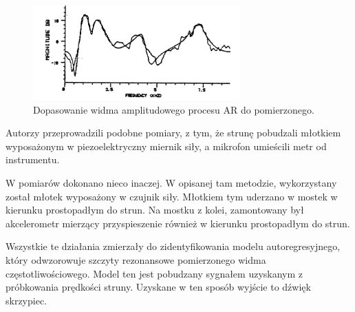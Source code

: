 \begin{figure}[H]
	\centering
	\includegraphics[width=8cm]{grafiki/hankel}
	\captionsetup{justification=centering}
	\caption{Dopasowanie widma amplitudowego procesu AR do pomierzonego.}
	\label{rys:hankel}
\end{figure}

Autorzy \cite{bowed_4} przeprowadzili podobne pomiary, z tym, że strunę pobudzali młotkiem wyposażonym w piezoelektryczny miernik siły, a mikrofon umieścili metr od instrumentu.

W \cite{bowed_2} pomiarów dokonano nieco inaczej. W opisanej tam metodzie, wykorzystany został młotek wyposażony w czujnik siły. Młotkiem tym uderzano w mostek w kierunku prostopadłym do strun. Na mostku z kolei, zamontowany był akcelerometr mierzący przyspieszenie również w kierunku prostopadłym do strun.

Wszystkie te działania zmierzały do zidentyfikowania modelu autoregresyjnego, który odwzorowuje szczyty rezonansowe pomierzonego widma częstotliwościowego. Model ten jest pobudzany sygnałem uzyskanym z próbkowania prędkości struny. Uzyskane w ten sposób wyjście to dźwięk skrzypiec.

